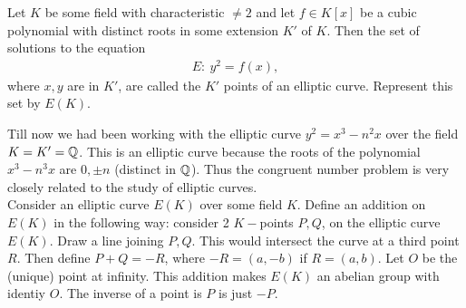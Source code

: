 \begin{definition}
  Let $K$ be some field with characteristic $\neq 2$ and let $f\in K[x]$ be a cubic polynomial with distinct roots in some extension $K'$ of $K$. Then the set of solutions to the equation
  \begin{align*}
    E:\ y^2 = f(x),
  \end{align*}
  where $x,y$ are in $K'$, are called the $K'$ points of an elliptic curve. Represent this set by $E(K)$.
\end{definition}

Till now we had been working with the elliptic curve $y^2 = x^3 - n^2x$ over the field $K = K' =\mathbb{Q}$. This is an elliptic curve because the roots of the polynomial $x^3 - n^3x$ are $0, \pm n$ (distinct in $\mathbb{Q}$). Thus the congruent number problem is very closely related to the study of elliptic curves.\\


Consider an elliptic curve $E(K)$ over some field $K$. Define an addition on $E(K)$ in the following way: consider 2 $K-$points $P,Q$, on the elliptic curve $E(K)$. Draw a line joining $P,Q$. This would intersect the curve at a third point $R$. Then define $P+Q = -R$, where $-R = (a,-b)$ if $R=(a,b)$. Let $O$ be the (unique) point at infinity. This addition makes $E(K)$ an abelian group with identiy $O$. The inverse of a point is $P$ is just $-P$.

